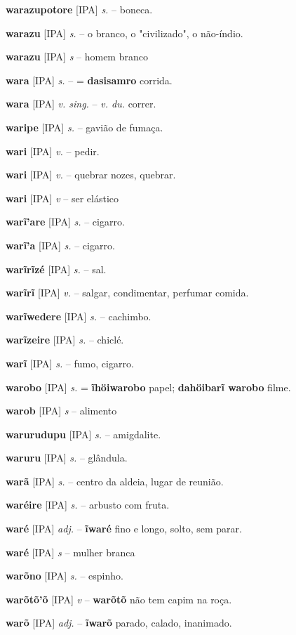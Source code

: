 \textbf{warazupotore} [IPA] \textit{s.} -- boneca.

\textbf{warazu} [IPA] \textit{s.} -- o branco, o "civilizado", o não-índio.

\textbf{warazu} [IPA] \textit{s} -- {homem branco}

\textbf{wara} [IPA] \textit{s.} -- = \textbf{dasisamro} corrida.

\textbf{wara} [IPA] \textit{v. sing.} -- \textit{v. du.} correr.

\textbf{waripe} [IPA] \textit{s.} -- gavião de fumaça.

\textbf{wari} [IPA] \textit{v.} -- pedir.

\textbf{wari} [IPA] \textit{v.} -- quebrar nozes, quebrar.

\textbf{wari} [IPA] \textit{v} -- {ser elástico}

\textbf{warĩ'are} [IPA] \textit{s.} -- cigarro.

\textbf{warĩ'a} [IPA] \textit{s.} -- cigarro.

\textbf{warĩrĩzé} [IPA] \textit{s.} -- sal.

\textbf{warĩrĩ} [IPA] \textit{v.} -- salgar, condimentar, perfumar comida.

\textbf{warĩwedere} [IPA] \textit{s.} -- cachimbo.

\textbf{warĩzeire} [IPA] \textit{s.} -- chiclé.

\textbf{warĩ} [IPA] \textit{s.} -- fumo, cigarro.

\textbf{warobo} [IPA] \textit{s.} = \textbf{ĩhöiwarobo} papel; \textbf{dahöibarĩ warobo} filme.

\textbf{warob} [IPA] \textit{s} -- {alimento}

\textbf{warurudupu} [IPA] \textit{s.} -- amigdalite.

\textbf{waruru} [IPA] \textit{s.} -- glândula.

\textbf{warã} [IPA] \textit{s.} -- centro da aldeia, lugar de reunião.

\textbf{waréire} [IPA] \textit{s.} -- arbusto com fruta.

\textbf{waré} [IPA] \textit{adj.} -- \textbf{ĩwaré} fino e longo, solto, sem parar.

\textbf{waré} [IPA] \textit{s} -- {mulher branca}

\textbf{warõno} [IPA] \textit{s.} -- espinho.

\textbf{warõtõ'õ} [IPA] \textit{v} -- \textbf{warõtõ} não tem capim na roça.

\textbf{warõ} [IPA] \textit{adj.} -- \textbf{ĩwarõ} parado, calado, inanimado.

